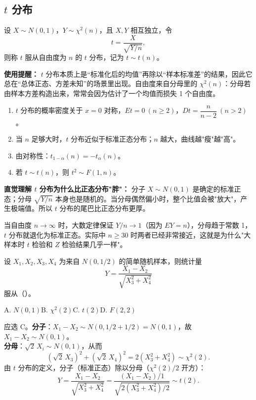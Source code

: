 ﻿\documentclass[lang=cn,11pt]{elegantbook}
\begin{document}
\subsection{\texorpdfstring{\(t\)}{t} 分布}

\begin{definition}[\texorpdfstring{\(t\)}{t} 分布] \label{def:t-dist}
设 \(X \sim N(0,1)\)，\(Y \sim \chi^2(n)\)，且 \(X, Y\) 相互独立，令
\[
t = \frac{X}{\sqrt{Y/n}},
\]
则称 \(t\) 服从自由度为 \(n\) 的 \(t\) 分布，记为 \(t \sim t(n)\)。
\end{definition}

\begin{note}
\textbf{使用提醒：} \(t\) 分布本质上是“标准化后的均值”再除以“样本标准差”的结果，因此它总在“总体正态、方差未知”的场景里出现。自由度来自分母里的 \(\chi^2(n)\)：分母若由样本方差构造出来，常常会因为估计了一个均值而损失 1 个自由度。
\end{note}

\begin{property}\label{prop:t-dist-property}
\begin{enumerate}
    \item \(t\) 分布的概率密度关于 \(x = 0\) 对称，\(Et = 0\ (n \geq 2)\)，\(Dt = \dfrac{n}{n-2}\ (n > 2)\)。
    \item 当 \(n\) 足够大时，\(t\) 分布近似于标准正态分布；\(n\) 越大，曲线越"瘦"越"高"。
    \item 由对称性：\(t_{1-\alpha}(n) = -t_\alpha(n)\)。
    \item 若 \(t \sim t(n)\)，则 \(t^2 \sim F(1,n)\)。
\end{enumerate}
\end{property}

\begin{note}
\textbf{直觉理解 $t$ 分布为什么比正态分布"胖"：} 分子 $X\sim N(0,1)$ 是确定的标准正态；分母 $\sqrt{Y/n}$ 本身也是随机的。当分母偶然偏小时，整个比值会被"放大"，产生极端值。所以 $t$ 分布的尾巴比正态分布更厚。

当自由度 $n\to\infty$ 时，大数定律保证 $Y/n\to 1$（因为 $EY=n$），分母趋于常数 1，$t$ 分布就退化为标准正态。实际中 $n\geqslant 30$ 时两者已经非常接近，这就是为什么"大样本时 $t$ 检验和 $Z$ 检验结果几乎一样"。
\end{note}

\begin{exercise} \label{ex:sampling_04}
设 \(X_1,X_2,X_3,X_4\) 为来自 \(N(0,1/2)\) 的简单随机样本，则统计量
\[
Y=\frac{X_1-X_2}{\sqrt{X_3^2+X_4^2}}
\]
服从（\quad）。\par
A. \(N(0,1)\)\qquad B. \(\chi^2(2)\)\qquad C. \(t(2)\)\qquad D. \(F(2,2)\)
\end{exercise}
\begin{solution}
应选 C。\textbf{分子}：\(X_1-X_2\sim N(0,1/2+1/2)=N(0,1)\)，故 \(X_1-X_2\sim N(0,1)\)。\\
\textbf{分母}：\(\sqrt{2}\,X_i\sim N(0,1)\)，从而
\[
(\sqrt{2}\,X_3)^2+(\sqrt{2}\,X_4)^2 = 2(X_3^2+X_4^2)\sim\chi^2(2).
\]
由 \(t\) 分布的定义，分子（标准正态）除以分母（\(\chi^2(2)/2\) 开方）：
\[
Y = \frac{X_1-X_2}{\sqrt{X_3^2+X_4^2}} = \frac{(X_1-X_2)/1}{\sqrt{2(X_3^2+X_4^2)/2}}\sim t(2).
\]
\end{solution}
\end{document}
